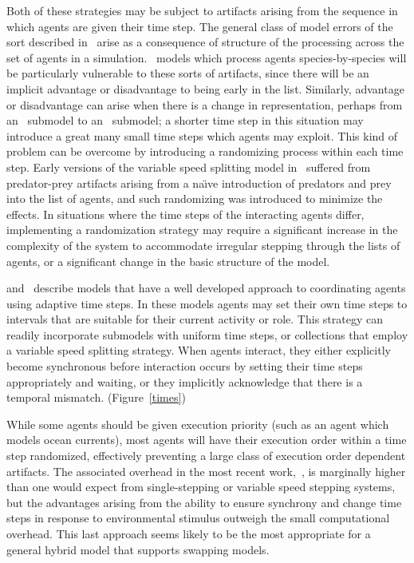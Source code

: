 Both of these strategies may be subject to artifacts arising from the
sequence in which agents are given their time step.  The general class
of model errors of the sort described in~\cite{chivers2009generalised}
arise as a consequence of structure of the processing across the set
of agents in a simulation. \IB\ models which process agents
species-by-species will be particularly vulnerable to these sorts of
artifacts, since there will be an implicit advantage or disadvantage
to being early in the list.  Similarly, advantage or disadvantage can
arise when there is a change in rep\-re\-sen\-ta\-tion, perhaps from an
\SD\ sub\-model to an \IB\ sub\-model; a shorter time step in this
situation may introduce a great many small time steps which agents may
exploit.  This kind of problem can be overcome by introducing a
randomizing process within each time step. Early versions of the
variable speed splitting model in~\cite{Lyne1994pmez5} suffered from
predator-prey artifacts arising from a na\"{\i}ve introduction of
predators and prey into the list of agents, and such randomizing was
introduced to minimize the effects. In situations where the time steps
of the interacting agents differ, implementing a randomization
strategy may require a significant increase in the complexity of the
system to accommodate irregular stepping through the lists of
agents, or a significant change in the basic structure of the model.

\Cite{Gray2006nws} and~\cite{Fulton2009crossingscales} describe models that have a well
developed approach to coordinating agents using adaptive time
steps. In these models agents may set their own time steps to
intervals that are suitable for their current activity or role. This
strategy can readily incorporate sub\-models with uniform time steps, or
collections that employ a variable speed splitting strategy. When
agents interact, they either explicitly become synchronous before
interaction occurs by setting their time steps appropriately and
waiting, or they implicitly acknowledge that there is a temporal
mismatch. (Figure~\ref{times})

While some agents should be given execution priority (such as an agent
which models ocean currents), most agents will have their execution
order within a time step randomized, effectively preventing a large
class of execution order dependent artifacts.  The associated overhead
in the most recent work,~\cite{Gray2006nws,Gray2012adaptive}, is marginally higher
than one would expect from single-stepping or variable speed stepping
systems, but the advantages arising from the ability to ensure
synchrony and change time steps in response to en\-vi\-ron\-men\-tal stimulus
outweigh the small computational overhead.  This last approach seems
likely to be the most appropriate for a general hybrid model that
supports swapping models.

